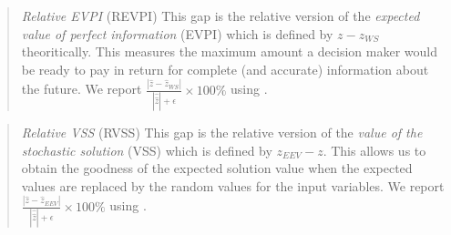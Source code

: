 
\begin{quote}
\noindent\textit{Relative EVPI} (REVPI) This gap is the relative version of the \textit{expected value of perfect information} (EVPI) which is defined by $z-z_{WS}$ theoritically. This measures the maximum amount a decision maker would be ready to pay in return for complete (and accurate) information about the future. We report $\frac{|\hat{z}-\hat{z}_{WS}|}{|\hat{\hat{z}}|+\epsilon}\times 100\%$ using \cplex.
\end{quote}

\begin{quote}
	\noindent\textit{Relative VSS} (RVSS) This gap is the relative version of the \textit{value of the stochastic solution} (VSS) which is defined by $z_{EEV}-z$. This allows us to obtain the goodness of the expected solution value when the expected values are replaced by the random values for the input variables. We report $\frac{|\hat{z}-\hat{z}_{EEV}|}{|\hat{\hat{z}}|+\epsilon}\times 100\%$ using \cplex.
\end{quote}





